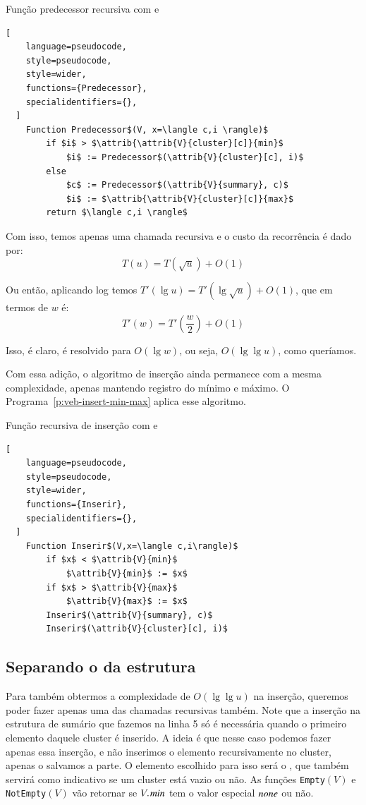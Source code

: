 \begin{programruledcaption}{Função predecessor recursiva com  e \label{p:veb-predecessor-min-max}}
  \begin{lstlisting}[
    language=pseudocode,
    style=pseudocode,
    style=wider,
    functions={Predecessor},
    specialidentifiers={},
  ]
    Function Predecessor$(V, x=\langle c,i \rangle)$
        if $i$ > $\attrib{\attrib{V}{cluster}[c]}{min}$
            $i$ := Predecessor$(\attrib{V}{cluster}[c], i)$
        else
            $c$ := Predecessor$(\attrib{V}{summary}, c)$
            $i$ := $\attrib{\attrib{V}{cluster}[c]}{max}$
        return $\langle c,i \rangle$
  \end{lstlisting}
\end{programruledcaption}

Com isso, temos apenas uma chamada recursiva e o custo da recorrência é dado
por:
\[
T(u) = T(\sqrt u) + O(1)
\]

Ou então, aplicando log temos $T'(\lg u) = T'(\lg \sqrt u) + O(1)$, que em
termos de $w$ é:
\[
T'(w) = T'\left (\frac{w}{2}\right ) + O(1)
\]

Isso, é claro, é resolvido para $O(\lg w)$, ou seja, $O(\lg \lg u)$, como
queríamos.

Com essa adição, o algoritmo de inserção ainda permanece com a mesma
complexidade, apenas mantendo registro do mínimo e máximo. O
Programa~\ref{p:veb-insert-min-max} aplica esse algoritmo.

\begin{programruledcaption}{Função recursiva de inserção com  e  \label{p:veb-insert-min-max}}
  \begin{lstlisting}[
    language=pseudocode,
    style=pseudocode,
    style=wider,
    functions={Inserir},
    specialidentifiers={},
  ]
    Function Inserir$(V,x=\langle c,i\rangle)$
        if $x$ < $\attrib{V}{min}$
            $\attrib{V}{min}$ := $x$
        if $x$ > $\attrib{V}{max}$
            $\attrib{V}{max}$ := $x$
        Inserir$(\attrib{V}{summary}, c)$
        Inserir$(\attrib{V}{cluster}[c], i)$
  \end{lstlisting}
\end{programruledcaption}

\subsection{Separando o  da estrutura}

Para também obtermos a complexidade de $O(\lg \lg u)$ na inserção, queremos
poder fazer apenas uma das chamadas recursivas também. Note que a inserção na
estrutura de sumário que fazemos na linha 5 só é necessária quando o primeiro
elemento daquele cluster é inserido. A ideia é que nesse caso podemos fazer
apenas essa inserção, e não inserimos o elemento recursivamente no cluster,
apenas o salvamos a parte. O elemento escolhido para isso será o , que
também servirá como indicativo se um cluster está vazio ou não. As funções
\texttt{Empty}$(V)$ e \texttt{NotEmpty}$(V)$ vão retornar se $\attrib{V}{min}$
tem o valor especial $\var{none}$ ou não. 

